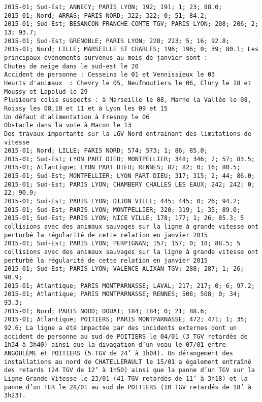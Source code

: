 \documentclass{article}
\begin{document}
\begin{Verbatim}[commandchars=\\\{\}]
2015-01; Sud-Est; ANNECY; PARIS LYON; 192; 191; 1; 23; 88.0; 
2015-01; Nord; ARRAS; PARIS NORD; 322; 322; 0; 51; 84.2; 
2015-01; Sud-Est; BESANCON FRANCHE COMTE TGV; PARIS LYON; 208; 206; 2; 13; 93.7; 
2015-01; Sud-Est; GRENOBLE; PARIS LYON; 228; 223; 5; 16; 92.8; 
2015-01; Nord; LILLE; MARSEILLE ST CHARLES; 196; 196; 0; 39; 80.1; Les principaux évènements survenus au mois de janvier sont :
Chutes de neige dans le sud-est le 20 
Accident de personne : Cesseins le 01 et Vennissieux le 03
Heurts d'animaux  : Chevry le 05, Neufmoutiers le 06, Cluny le 18 et Moussy et Lapalud le 29
Plusieurs colis suspects : à Marseille le 08, Marne la Vallée le 08, Roissy les 08,10 et 11 et à Lyon les 09 et 15
Un défaut d'alimentation à Fresnoy le 06
Obstacle dans la voie à Macon le 13
Des travaux importants sur la LGV Nord entrainant des limitations de vitesse
2015-01; Nord; LILLE; PARIS NORD; 574; 573; 1; 86; 85.0; 
2015-01; Sud-Est; LYON PART DIEU; MONTPELLIER; 348; 346; 2; 57; 83.5; 
2015-01; Atlantique; LYON PART DIEU; RENNES; 82; 82; 0; 16; 80.5; 
2015-01; Sud-Est; MONTPELLIER; LYON PART DIEU; 317; 315; 2; 44; 86.0; 
2015-01; Sud-Est; PARIS LYON; CHAMBERY CHALLES LES EAUX; 242; 242; 0; 22; 90.9; 
2015-01; Sud-Est; PARIS LYON; DIJON VILLE; 445; 445; 0; 26; 94.2; 
2015-01; Sud-Est; PARIS LYON; MONTPELLIER; 320; 319; 1; 35; 89.0; 
2015-01; Sud-Est; PARIS LYON; NICE VILLE; 178; 177; 1; 26; 85.3; 5 collisions avec des animaux sauvages sur la ligne à grande vitesse ont perturbé la régularité de cette relation en janvier 2015
2015-01; Sud-Est; PARIS LYON; PERPIGNAN; 157; 157; 0; 18; 88.5; 5 collisions avec des animaux sauvages sur la ligne à grande vitesse ont perturbé la régularité de cette relation en janvier 2015
2015-01; Sud-Est; PARIS LYON; VALENCE ALIXAN TGV; 288; 287; 1; 26; 90.9; 
2015-01; Atlantique; PARIS MONTPARNASSE; LAVAL; 217; 217; 0; 6; 97.2; 
2015-01; Atlantique; PARIS MONTPARNASSE; RENNES; 508; 508; 0; 34; 93.3; 
2015-01; Nord; PARIS NORD; DOUAI; 184; 184; 0; 21; 88.6; 
2015-01; Atlantique; POITIERS; PARIS MONTPARNASSE; 472; 471; 1; 35; 92.6; La ligne a été impactée par des incidents externes dont un accident de personne au sud de POITIERS le 04/01 (3 TGV retardés de 1h34 à 3h40) ainsi que la divagation d’un veau le 07/01 entre ANGOULÊME et POITIERS (5 TGV de 24’ à 1h04). Un dérangement des installations au nord de CHATELLERAULT le 15/01 a également entraîné des retards (24 TGV de 12’ à 1h50) ainsi que la panne d’un TGV sur la Ligne Grande Vitesse le 23/01 (41 TGV retardés de 11’ à 3h18) et la panne d’un TER le 28/01 au sud de POITIERS (10 TGV retardés de 18’ à 3h23).

\end{Verbatim}
\end{document}
